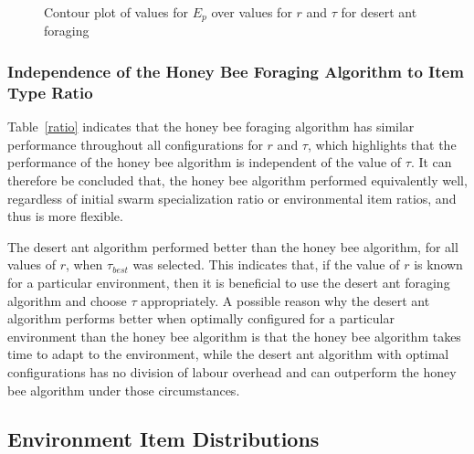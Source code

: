 \begin{figure}[!htb]
\centering
\resizebox{0.8\textwidth}{!}{}
\caption{Contour plot of values for $E_p$ over values for $r$ and $\tau$ for desert ant foraging}
\label{desertantplot}
\end{figure}


%


\subsubsection{Independence of the Honey Bee Foraging Algorithm to Item Type Ratio}
\label{Adaptability}

Table~\ref{ratio} indicates that the honey bee foraging algorithm has similar performance throughout all configurations for $r$ and $\tau$, which highlights that the performance of the honey bee algorithm is independent of the value of $\tau$. It can therefore be concluded that, the honey bee algorithm performed equivalently well, regardless of initial swarm specialization ratio or environmental item ratios, and thus is more flexible.

The desert ant algorithm performed better than the honey bee algorithm, for all values of $r$, when $\tau_{best}$ was selected. This indicates that, if the value of $r$ is known for a particular environment, then it is beneficial to use the desert ant foraging algorithm and choose $\tau$ appropriately. A possible reason why the desert ant algorithm performs better when optimally configured for a particular environment than the honey bee algorithm is that the honey bee algorithm takes time to adapt to the environment, while the desert ant algorithm with optimal configurations has no division of labour overhead and can outperform the honey bee algorithm under those circumstances.

\subsection{Environment Item Distributions}
\label{results:environmentaltypes}

